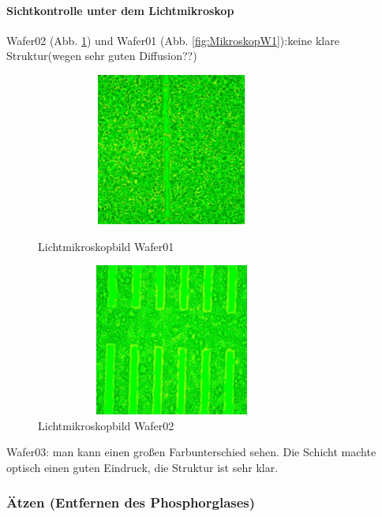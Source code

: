\paragraph[Sichtkontrolle unter dem Lichtmikroskop ]{Sichtkontrolle unter dem Lichtmikroskop }
Wafer02 (Abb. \ref{fig:MikroskopW2}) und Wafer01 (Abb. \ref{fig:MikroskopW1}):keine klare Struktur(wegen sehr guten Diffusion??)


\begin{figure}[H]
\centering
\begin{minipage}[hbt]{6cm}
    \centering
    \includegraphics[width=0.8\textwidth, height=5cm]{bilder/MikroskopW1.png}
  \caption{Lichtmikroskopbild Wafer01}
  \label{fig:MikroskopW1}
\end{minipage}
\begin{minipage}[hbt]{6cm}
    \centering
    \includegraphics[width=0.8\textwidth,height=5cm]{bilder/MikroskopW2.png}
  \caption{Lichtmikroskopbild Wafer02}
  \label{fig:MikroskopW2}
\end{minipage}

\end{figure}

Wafer03: man kann einen großen Farbunterschied sehen. Die Schicht machte optisch einen guten Eindruck, die Struktur ist sehr klar.


\subsubsection[Ätzen (Entfernen des Phosphorglases)]{Ätzen (Entfernen des Phosphorglases)}

